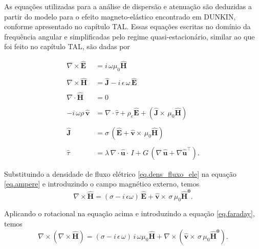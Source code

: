 As equa\c{c}\~oes utilizadas para a an\'alise de dispers\~ao e atenua\c{c}\~ao s\~ao deduzidas a partir do modelo para o efeito magneto-el\'astico encontrado em DUNKIN, conforme apresentado no cap\'itulo TAL. Essas equa\c{c}\~oes escritas no dom\'inio da frequ\^encia angular e simplificadas pelo regime quasi-estacion\'ario, similar ao que foi feito no cap\'itulo TAL, s\~ao dadas por 


\begin{align}\label{eq.faraday}
\nabla\times\mathbf{\widehat{E}}&=i\,\omega\mu_0\mathbf{\widehat{H}}\\\nonumber\\\label{eq.ampere}
\nabla\times\mathbf{\widehat{H}}&=\mathbf{\widehat{J}}-i\,\epsilon\,\omega\,\mathbf{\widehat{E}}\\\nonumber\\\label{eq.div_B}
\nabla\cdot\mathbf{\widehat{H}}&=0\\\nonumber\\\label{eq.equi_couchy}
-i\,\omega\rho\,\mathbf{\widehat{v}}&=\nabla\cdot\widehat{\tau}+\rho_e\mathbf{\widehat{E}}+(\mathbf{\widehat{J}}\times\,\mu_0\mathbf{\widehat{H}})\\\nonumber\\\label{eq.dens_fluxo_ele}
\mathbf{\widehat{J}}&=\sigma\,(\mathbf{\widehat{E}}+\mathbf{\widehat{v}}\times\,\mu_0\mathbf{\widehat{H}})\\\nonumber\\\label{eq.Lame}
\widehat{\tau}&=\lambda\,\nabla\cdot\mathbf{\widehat{u}}\cdot\,I + G\,(\nabla\,\mathbf{\widehat{u}}+\nabla\mathbf{\widehat{u}}^\top).
\end{align}

Substituindo a densidade de fluxo el\'etrico \ref{eq.dens_fluxo_ele} na equa\c{c}\~ao \ref{eq.ampere} e introduzindo o campo magn\'etico externo, temos
\begin{equation*}
\nabla\times\mathbf{\widehat{H}}=(\sigma-i\,\epsilon\omega)\,\mathbf{\widehat{E}}+\mathbf{\widehat{v}}\times\,\sigma\,\mu_0\mathbf{\widehat{H}^0}.
\end{equation*}

Aplicando o rotacional na equa\c{c}\~ao acima e introduzindo a equa\c{c}\~ao \ref{eq.faraday}, temos
\begin{equation*}
\nabla\times(\nabla\times\mathbf{\widehat{H}})=(\sigma-i\,\epsilon\,\omega)\,i\,\omega\mu_0\mathbf{\widehat{H}}+\nabla\times(\mathbf{\widehat{v}}\times\,\sigma\,\mu_0\mathbf{\widehat{H}^0}).
\end{equation*}

